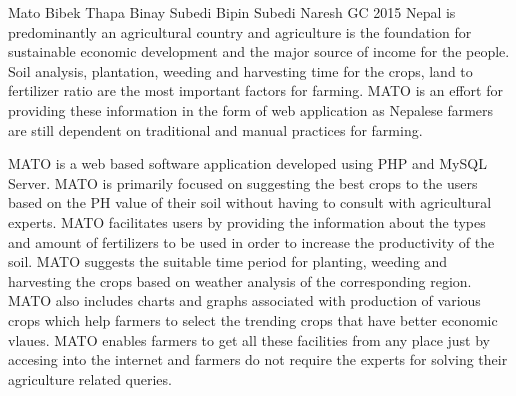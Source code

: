  \begin{conf-abstract}[]
{Mato}
{
Bibek Thapa
Binay Subedi
Bipin Subedi
Naresh GC
}
{2015}
Nepal is predominantly an agricultural country and agriculture is the foundation for sustainable economic development and the major source of income for the people. Soil analysis, plantation, weeding and harvesting time for the crops, land to fertilizer ratio are the most important factors for farming. MATO is an effort for providing these information in the form of web application as Nepalese farmers are still dependent on traditional and manual practices for farming.

MATO is a web based software application developed using PHP and MySQL Server. MATO is primarily focused on suggesting the best crops to the users based on the PH value of their soil without having to consult with agricultural experts. MATO facilitates users by providing the information about the types and amount of fertilizers to be used in order to increase the productivity of the soil. MATO suggests the suitable time period for planting, weeding and harvesting the crops based on weather analysis of the corresponding region. MATO also includes charts and graphs associated with production of various crops which help farmers to select the trending crops that have better economic vlaues. MATO enables farmers to get all these facilities from any place just by accesing into the internet and farmers do not require the experts for solving their agriculture related queries.
  \end{conf-abstract}
